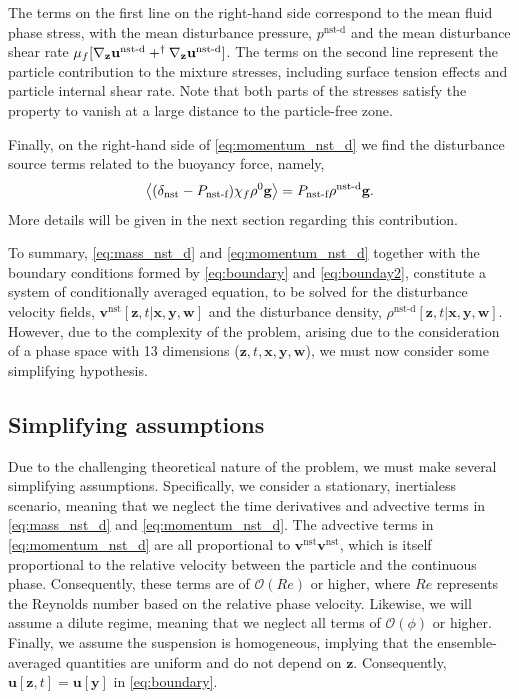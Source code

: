 The terms on the first line on the right-hand side correspond to the mean fluid phase stress, with the mean disturbance pressure, $p^\text{nst-d}$ and the mean disturbance shear rate $\mu_f [{\mathbf{\nabla}_\textbf{z}} \textbf{u}^\text{nst-d}+^\dagger{\mathbf{\nabla}_\textbf{z}} \textbf{u}^\text{nst-d}]$. 
The terms on the second line represent the particle contribution to the mixture stresses, including surface tension effects and particle internal shear rate. 
Note that both parts of the stresses satisfy the property to vanish at a large distance to the particle-free zone.

Finally, on the right-hand side of \ref{eq:momentum_nst_d} we find the disturbance source terms related to the buoyancy force, namely,
\begin{equation*}
    \left<(\delta_\text{nst} - P_\text{nst-f}) \chi_f \rho^0 \textbf{g}\right>
    = 
    P_\text{nst-f} \rho^\text{nst-d} \textbf{g}. 
\end{equation*}
More details will be given in the next section regarding this contribution. 

To summary, \ref{eq:mass_nst_d} and \ref{eq:momentum_nst_d} together with the boundary conditions formed by \ref{eq:boundary} and \ref{eq:bounday2}, constitute a system of conditionally averaged equation, to be solved for the disturbance velocity fields, $\textbf{v}^\text{nst}[\textbf{z},t|\textbf{x},\textbf{y},\textbf{w}]$ and the disturbance density, $\rho^\text{nst-d}[\textbf{z},t|\textbf{x},\textbf{y},\textbf{w}]$.
However, due to the complexity of the problem, arising due to the consideration of a phase space with  13 dimensions ($\textbf{z},t,\textbf{x},\textbf{y},\textbf{w}$), we must now consider some simplifying hypothesis.

\subsection{Simplifying assumptions}

Due to the challenging theoretical nature of the problem, we must make several simplifying assumptions. 
Specifically, we consider a stationary, inertialess scenario, meaning that we neglect the time derivatives and advective terms in \ref{eq:mass_nst_d} and \ref{eq:momentum_nst_d}. 
The advective terms in \ref{eq:momentum_nst_d} are all proportional to $\textbf{v}^\text{nst}\textbf{v}^\text{nst}$, which is itself proportional to the relative velocity between the particle and the continuous phase. Consequently, these terms are of $\mathcal{O}(Re)$ or higher, where $Re$ represents the Reynolds number based on the relative phase velocity.
Likewise, we will assume a dilute regime, meaning that we neglect all terms of $\mathcal{O}(\phi)$ or higher. Finally, we assume the suspension is homogeneous, implying that the ensemble-averaged quantities are uniform and do not depend on $\textbf{z}$.
Consequently, $\textbf{u}[\textbf{z},t] = \textbf{u}[\textbf{y}]$ in \ref{eq:boundary}. 


